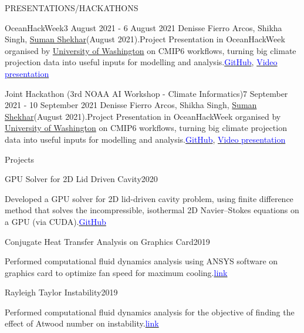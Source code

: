 \documentclass{resume} %
\begin{document}
\begin{rSection}{PRESENTATIONS/HACKATHONS}
\begin{rSubsection}{OceanHackWeek}{3 August 2021 - 6 August 2021}{}
Denisse Fierro Arcos, Shikha Singh, \underline{Suman Shekhar}(August 2021).Project Presentation in OceanHackWeek organised by \underline{University of Washington}  on CMIP6 workflows, turning big climate projection data into useful inputs for modelling and analysis.\href{https://github.com/oceanhackweek/ohw21-proj-cmip-ard}{\textcolor{blue}{GitHub}}, \href{https://youtu.be/Y5e50p39mnQ}{\textcolor{blue}{Video presentation}}  
\end{rSubsection}
\begin{rSubsection}{Joint Hackathon (3rd NOAA AI Workshop - Climate Informatics)}{7 September 2021 - 10 September 2021}{}
Denisse Fierro Arcos, Shikha Singh, \underline{Suman Shekhar}(August 2021).Project Presentation in OceanHackWeek organised by \underline{University of Washington}  on CMIP6 workflows, turning big climate projection data into useful inputs for modelling and analysis.\href{https://github.com/oceanhackweek/ohw21-proj-cmip-ard}{\textcolor{blue}{GitHub}}, \href{https://youtu.be/Y5e50p39mnQ}{\textcolor{blue}{Video presentation}}  
\end{rSubsection}
\end{rSection}
\begin{rSection}{Projects}
\begin{rSubsection}{GPU Solver for 2D Lid Driven Cavity}{2020}{}
\item Developed a GPU solver for 2D lid-driven cavity problem, using finite difference method that solves the incompressible, isothermal 2D Navier–Stokes equations on a GPU (via CUDA).\href{https://github.com/Sumanshekhar17/3rd-year-project}{\textcolor{blue}{GitHub}}
\end{rSubsection}
\begin{rSubsection}{Conjugate Heat Transfer Analysis on Graphics Card}{2019}{}
\item Performed computational fluid dynamics analysis using ANSYS software on graphics card to optimize fan speed for maximum cooling.\href{https://skill-lync.com/student-projects/conjugate-heat-transfer-analysis-on-a-graphics-card-62}{\textcolor{blue}{link}}
\end{rSubsection}

\begin{rSubsection}{Rayleigh Taylor Instability}{2019}{}
\item Performed computational fluid dynamics analysis for the objective of finding the effect of Atwood number on instability.\href{https://skill-lync.com/student-projects/rayleigh-taylor-instability-challenge-35}{\textcolor{blue}{link}}
\end{rSubsection}

\end{rSection}
\end{document}
